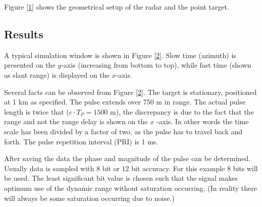 \smallskip 
\pagebreak%

\smallskip Figure \ref{1} shows the geometrical setup of the radar and the
point target.\smallskip 


\subsection{\protect\smallskip \protect\smallskip Results}

A typical simulation window is shown in Figure \ref{2}. Slow time (azimuth)
is presented on the $y$-axis (increasing from bottom to top), while fast
time (shown as slant range) is displayed on the $x$-axis.


Several facts can be observed from Figure \ref{2}. The target is stationary,
positioned at 1 km as specified. The pulse extends over 750 m in range. The
actual pulse length is twice that ($c\cdot T_{P}=1500$ m), the discrepancy
is due to the fact that the range and not the range delay is shown on the $x$%
-axis. In other words the time scale has been divided by a factor of two, as
the pulse has to travel back and forth. The pulse repetition interval (PRI)
is 1 ms.

After saving the data the phase and magnitude of the pulse can be
determined. Usually data is sampled with 8 bit or 12 bit accuracy. For this
example 8 bits will be used. The least significant bit value is chosen such
that the signal makes optimum use of the dynamic range without saturation
occurring. (In reality there will always be some saturation occurring due to
noise.)


